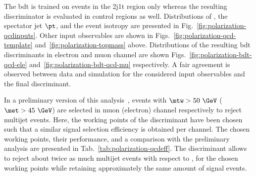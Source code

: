 The \gls{bdt} is trained on events in the 2j1t region only whereas the resulting discriminator is evaluated in control regions as well. Distributions of \mtw, the spectator jet $\pt$, and the event isotropy are presented in Fig.~\ref{fig:polarization-qcdinputs}. Other input observables are shown in Figs.~\ref{fig:polarization-qcd-template} and~\ref{fig:polarization-topmass} above. Distributions of the resulting \gls{bdt} discriminants in electron and muon channel are shown Figs.~\ref{fig:polarization-bdt-qcd-ele} and~\ref{fig:polarization-bdt-qcd-mu} respectively. A fair agreement is observed between data and simulation for the considered input observables and the final discriminant.


In a preliminary version of this analysis~\cite{CMS-PAS-TOP-13-001}, events with $\mtw>50~\GeV$ ($\met>45~\GeV$) are selected in muon (electron) channel respectively to reject multijet events. Here, the working points of the \bdtqcd discriminant have been chosen such that a similar signal selection efficiency is obtained per channel.  The chosen working points, their performance, and a comparison with the preliminary analysis are presented in Tab.~\ref{tab:polarization-qcdeff}. The \bdtqcd discriminant allows to reject about twice as much multijet events with respect to \mtw, \met for the chosen working points while retaining approximately the same amount of signal events.


